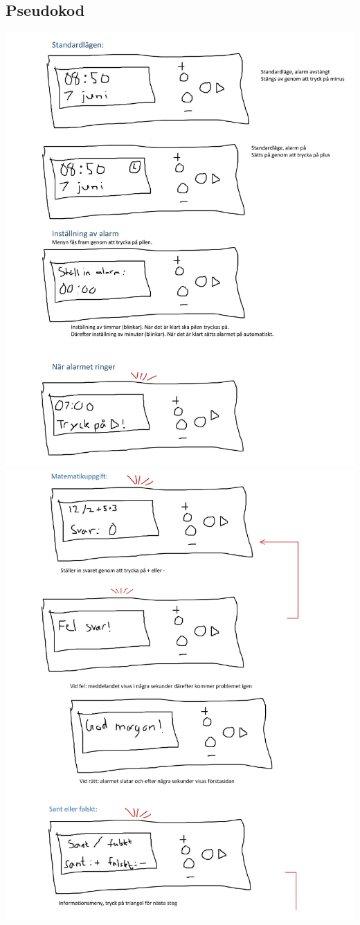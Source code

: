 \documentclass[12pt, a4paper,titlepage]{article}
\begin{document}
        \subsection{Pseudokod}
            \label{sec:psuedo}
            \includegraphics[scale=0.35]{Pseudokod-1.jpg}
            \newpage
            \includegraphics[scale=0.35]{Pseudokod-2.jpg}
\end{document}
